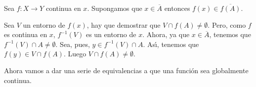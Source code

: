 \begin{proposicion}\label{pro,caraccont}Sea $f:X\rightarrow Y$ continua en $x$. Supongamos que $x\in
\overline{A}$ entonces $f(x)\in\overline{f(A)}$.
\end{proposicion}

\begin{demo} Sea $V$ un entorno de $f(x)$, hay que demostrar que
$V\cap f(A)\neq\emptyset$. Pero, como $f$ es continua en $x$,
$f^{-1}(V)$ es un entorno de $x$. Ahora, ya que
$x\in\overline{A}$, tenemos que $f^{-1}(V)\cap A\neq\emptyset$.
Sea, pues, $y\in f^{-1}(V)\cap A$. As\'{\i}, tenemos que $f(y)\in
V\cap f(A)$. Luego $V\cap f(A)\neq\emptyset$.
\end{demo}

Ahora vamos a dar una serie de equivalencias a que una funci\'on
sea globalmente continua.

